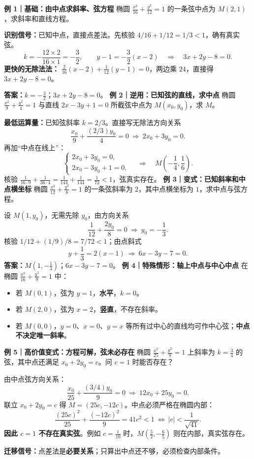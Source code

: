 \clearpage
\begin{examplebox}
\textbf{\textcolor{CExample}{例 1｜基础：由中点求斜率、弦方程}}
椭圆 $\frac{x^2}{16}+\frac{y^2}{12}=1$ 的一条弦中点为 $M(2,1)$，求斜率和直线方程。
\begin{center}\end{center}
\par\textbf{识别信号：}已知中点，直接点差法。先核验 $4/16+1/12=1/3<1$，确有真实弦。
\[
k=-\frac{12\times2}{16\times1}=-\frac32,\qquad
 y-1=-\frac32(x-2)\quad\Longrightarrow\quad\boxed{3x+2y-8=0}.
\]
\textbf{更快的无除法法：}
$\frac2{16}(x-2)+\frac1{12}(y-1)=0$，两边乘 $24$，直接得 $3x+2y-8=0$。
\par\textbf{答案：}$k=-\frac32$；$3x+2y-8=0$。
\medskip
\textbf{\textcolor{CExample}{例 2｜逆用：已知弦的直线，求中点}}
椭圆 $\frac{x^2}{9}+\frac{y^2}{4}=1$ 与直线 $2x-3y+1=0$ 所截弦中点为 $M(x_0,y_0)$，求 $M$。
\par\textbf{最低运算量：}已知弦斜率 $k=2/3$。直接写无除法方向关系
\[
 \frac{x_0}{9}+\frac{(2/3)y_0}{4}=0
 \ \Longrightarrow\ 2x_0+3y_0=0.
\]
再加“中点在线上”：
\[
\begin{cases}2x_0+3y_0=0,\\2x_0-3y_0+1=0,\end{cases}
\quad\Longrightarrow\quad\boxed{M(-\frac14,\frac16)}.
\]
核验 $\frac{1}{16\cdot9}+\frac{1}{36\cdot4}=\frac1{144}+\frac1{144}=\frac1{72}<1$，弦真实存在。
\medskip
\textbf{\textcolor{CExample}{例 3｜变式：已知斜率和中点横坐标}}
椭圆 $\frac{x^2}{12}+\frac{y^2}{8}=1$ 的一条弦斜率为 $2$，其中点横坐标为 $1$，求中点与弦方程。
\par 设 $M(1,y_0)$，无需先除 $y_0$，由方向关系
\[
 \frac1{12}+\frac{2y_0}{8}=0
 \ \Longrightarrow\ y_0=-\frac13.
\]
核验 $1/12+(1/9)/8=7/72<1$；由点斜式
\[
 y+\frac13=2(x-1)\ \Longrightarrow\ \boxed{6x-3y-7=0}.
\]
\textbf{答案：}$M(1,-\frac13)$；$6x-3y-7=0$。
\medskip
\textbf{\textcolor{CExample}{例 4｜特殊情形：轴上中点与中心中点}}
在椭圆 $\frac{x^2}{16}+\frac{y^2}{9}=1$ 中：
\begin{itemize}[leftmargin=*,itemsep=0.3em]
\item 若 $M(0,1)$，弦为 $y=1$，\textbf{水平}，$k=0$。
\item 若 $M(2,0)$，弦为 $x=2$，\textbf{竖直}，不存在斜率。
\item 若 $M(0,0)$，$y=0$、$x=0$、$y=x$ 等所有过中心的直线均可作中心弦；\textbf{中点不决定唯一斜率}。
\end{itemize}
\medskip
\textbf{\textcolor{CExample}{例 5｜高价值变式：方程可解，弦未必存在}}
椭圆 $\frac{x^2}{25}+\frac{y^2}{9}=1$ 上斜率为 $k=\frac34$ 的弦，其中点还满足 $x_0+2y_0=c$。问 $c=1$ 时能否存在？
\par 由中点弦方向关系：
\[
 \frac{x_0}{25}+\frac{(3/4)y_0}{9}=0
 \ \Longrightarrow\ 12x_0+25y_0=0.
\]
联立 $x_0+2y_0=c$ 得 $M=(25c,-12c)$。中点必须严格在椭圆内部：
\[
 \frac{(25c)^2}{25}+\frac{(-12c)^2}{9}=41c^2<1
 \ \Longleftrightarrow\ |c|<\frac1{\sqrt{41}}.
\]
\textbf{因此 $c=1$ 不存在真实弦}。例如 $c=\frac1{10}$ 时，$M(\frac52,-\frac65)$ 则在内部，真实弦存在。
\par\textbf{迁移信号：}点差法是\textbf{必要关系}；只算出中点还不够，必须检查内部条件。
\end{examplebox}
